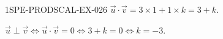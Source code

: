 \begin{corrige}{1SPE-PRODSCAL-EX-026}
$\vec{u} \cdot \vec{v} = 3 \times 1 + 1 \times k = 3 + k$.

$\vec{u} \perp \vec{v} \iff \vec{u} \cdot \vec{v} = 0 \iff 3 + k = 0 \iff k = -3$.
\end{corrige}
